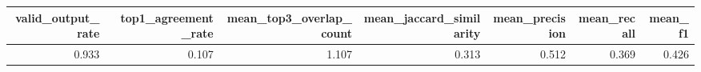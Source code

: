 \begin{tabular}{rrrrrrr}
\toprule
valid_output_rate & top1_agreement_rate & mean_top3_overlap_count & mean_jaccard_similarity & mean_precision & mean_recall & mean_f1 \\
\midrule
0.933 & 0.107 & 1.107 & 0.313 & 0.512 & 0.369 & 0.426 \\
\bottomrule
\end{tabular}
